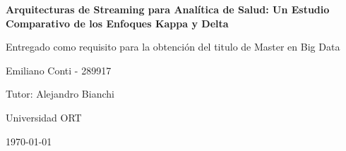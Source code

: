 \begin{titlepage}
    \centering
    {\huge\bfseries Arquitecturas de Streaming para Analítica de Salud: Un Estudio Comparativo de los Enfoques Kappa y Delta \par}
    \vspace{2cm}
    {\Large Entregado como requisito para la obtención del
titulo de Master en Big Data\par}
    \vspace{1cm}
    {\large Emiliano Conti - 289917\par}
    \vspace{1cm}
    {\large Tutor: Alejandro Bianchi \par}
    \vspace{1cm}
    {\small Universidad ORT\par}
    \vspace{1cm}
    {\large \today\par}
\end{titlepage}